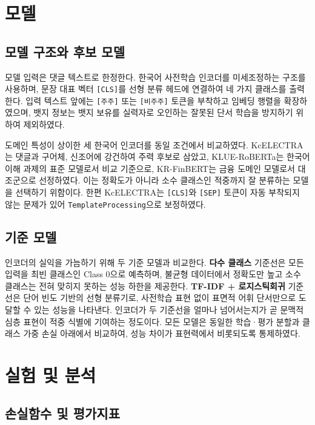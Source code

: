\documentclass[11pt]{article}
\begin{document}
\section{모델}

\subsection{모델 구조와 후보 모델}

모델 입력은 댓글 텍스트로 한정한다. 한국어 사전학습 인코더를 미세조정하는 구조를 사용하며, 문장 대표 벡터 \texttt{[CLS]}를 선형 분류 헤드에 연결하여 네 가지 클래스를 출력한다. 입력 텍스트 앞에는 \texttt{[주주]} 또는 \texttt{[비주주]} 토큰을 부착하고 임베딩 행렬을 확장하였으며, 뱃지 정보는 뱃지 보유를 실력자로 오인하는 잘못된 단서 학습을 방지하기 위하여 제외하였다.

도메인 특성이 상이한 세 한국어 인코더를 동일 조건에서 비교하였다. KcELECTRA는 댓글과 구어체, 신조어에 강건하여 주력 후보로 삼았고, KLUE-RoBERTa는 한국어 이해 과제의 표준 모델로서 비교 기준으로, KR-FinBERT는 금융 도메인 모델로서 대조군으로 선정하였다. 이는 정확도가 아니라 소수 클래스인 적중까지 잘 분류하는 모델을 선택하기 위함이다. 한편 KcELECTRA는 \texttt{[CLS]}와 \texttt{[SEP]} 토큰이 자동 부착되지 않는 문제가 있어 \texttt{TemplateProcessing}으로 보정하였다.

\subsection{기준 모델}

인코더의 실익을 가늠하기 위해 두 기준 모델과 비교한다. \textbf{다수 클래스} 기준선은 모든 입력을 최빈 클래스인 Class 0으로 예측하며, 불균형 데이터에서 정확도만 높고 소수 클래스는 전혀 맞히지 못하는 성능 하한을 제공한다. \textbf{TF-IDF + 로지스틱회귀} 기준선은 단어 빈도 기반의 선형 분류기로, 사전학습 표현 없이 표면적 어휘 단서만으로 도달할 수 있는 성능을 나타낸다. 인코더가 두 기준선을 얼마나 넘어서는지가 곧 문맥적 심층 표현이 적중 식별에 기여하는 정도이다. 모든 모델은 동일한 학습·평가 분할과 클래스 가중 손실 아래에서 비교하여, 성능 차이가 표현력에서 비롯되도록 통제하였다.

\section{실험 및 분석}

\subsection{손실함수 및 평가지표}
\end{document}

